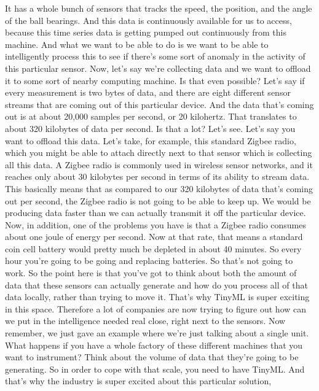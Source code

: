   It has a whole bunch of sensors that tracks the speed, the position,
  and the angle of the ball bearings.
  And this data is continuously available for us to access,
  because this time series data is getting pumped out continuously
  from this machine.
  And what we want to be able to do is we want
  to be able to intelligently process this to see
  if there's some sort of anomaly in the activity of this particular sensor.
  Now, let's say we're collecting data and we
  want to offload it to some sort of nearby computing machine.
  Is that even possible?
  Let's say if every measurement is two bytes of data,
  and there are eight different sensor streams that are coming out
  of this particular device.
  And the data that's coming out is at about 20,000 samples per second,
  or 20 kilohertz.
  That translates to about 320 kilobytes of data per second.
  Is that a lot?
  Let's see.
  Let's say you want to offload this data.
  Let's take, for example, this standard Zigbee
  radio, which you might be able to attach directly next to that sensor which
  is collecting all this data.
  A Zigbee radio is commonly used in wireless sensor networks,
  and it reaches only about 30 kilobytes per second in terms of its ability
  to stream data.
  This basically means that as compared to our 320 kilobytes of data
  that's coming out per second, the Zigbee radio
  is not going to be able to keep up.
  We would be producing data faster than we can actually
  transmit it off the particular device.
  Now, in addition, one of the problems you have
  is that a Zigbee radio consumes about one joule of energy per second.
  Now at that rate, that means a standard coin cell battery would pretty much
  be depleted in about 40 minutes.
  So every hour you're going to be going and replacing batteries.
  So that's not going to work.
  So the point here is that you've got to think about both the amount of data
  that these sensors can actually generate and how do you process all of that data
  locally, rather than trying to move it.
  That's why TinyML is super exciting in this space.
  Therefore a lot of companies are now trying
  to figure out how can we put in the intelligence needed
  real close, right next to the sensors.
  Now remember, we just gave an example where
  we're just talking about a single unit.
  What happens if you have a whole factory of these different machines
  that you want to instrument?
  Think about the volume of data that they're going to be generating.
  So in order to cope with that scale, you need to have TinyML.
  And that's why the industry is super excited about this particular solution,

